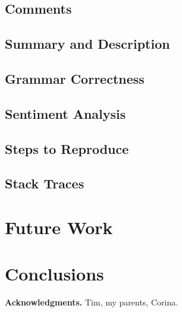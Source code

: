 \documentclass{mpaper}
\begin{document}
\subsection{Comments}

\subsection{Summary and Description}

\subsection{Grammar Correctness}

\subsection{Sentiment Analysis}

\subsection{Steps to Reproduce}

\subsection{Stack Traces}

\section{Future Work}\label{future_work}

\section{Conclusions}\label{conclusions}

\vskip8pt \noindent
{\bf Acknowledgments.}
Tim, my parents, Corina.



\end{document}

